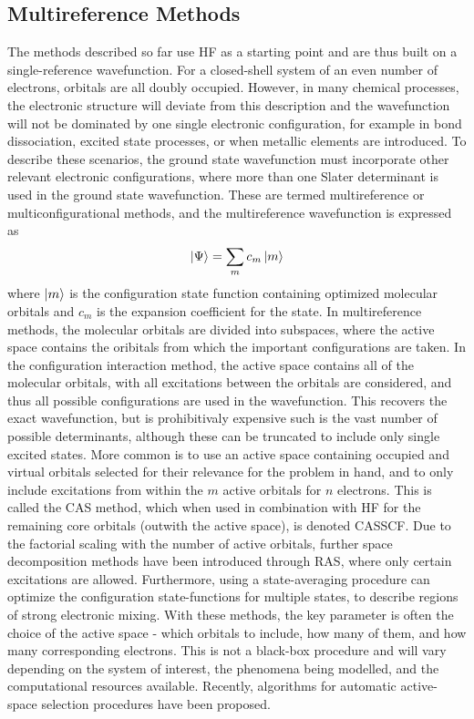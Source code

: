 \subsection{Multireference Methods}\label{section: methods_multiconf}
The methods described so far use \ac{HF} as a starting point and are thus built on a single-reference wavefunction. For a closed-shell system of an even number of electrons, orbitals are all doubly occupied. However, in many chemical processes, the electronic structure will deviate from this description and the wavefunction will not be dominated by one single electronic configuration, for example in bond dissociation, excited state processes, or when metallic elements are introduced. To describe these scenarios, the ground state wavefunction must incorporate other relevant electronic configurations, where more than one Slater determinant is used in the ground state wavefunction. These are termed multireference or multiconfigurational methods, and the multireference wavefunction is expressed as
\begin{equation}
    \ket{\Psi}=\sum_{m}c_{m}\ket{m}
\end{equation}
where $\ket{m}$ is the configuration state function containing optimized molecular orbitals and $c_{m}$ is the expansion coefficient for the state. In multireference methods, the molecular orbitals are divided into subspaces, where the active space contains the oribitals from which the important configurations are taken. In the configuration interaction method, the active space contains all of the molecular orbitals, with all excitations between the orbitals are considered, and thus all possible configurations are used in the wavefunction. This recovers the exact wavefunction, but is prohibitivaly expensive such is the vast number of possible determinants, although these can be truncated to include only single excited states. More common is to use an active space containing occupied and virtual orbitals selected for their relevance for the problem in hand, and to only include excitations from within the $m$ active orbitals for $n$  electrons. This is called the \ac{CAS} method, which when used in combination with \ac{HF} for the remaining core orbitals (outwith the active space), is denoted \ac{CASSCF}.\cite{Roos1980} Due to the factorial scaling with the number of active orbitals, further space decomposition methods have been introduced through \ac{RAS}, where only certain excitations are allowed. Furthermore, using a state-averaging procedure can optimize the configuration state-functions for multiple states, to describe regions of strong electronic mixing. With these methods, the key parameter is often the choice of the active space - which orbitals to include, how many of them, and how many corresponding electrons. This is not a black-box procedure and will vary depending on the system of interest, the phenomena being modelled, and the computational resources available.\cite{Lischka2018} Recently, algorithms for automatic active-space selection procedures have been proposed.\cite{Stein2016,Bao2018}

